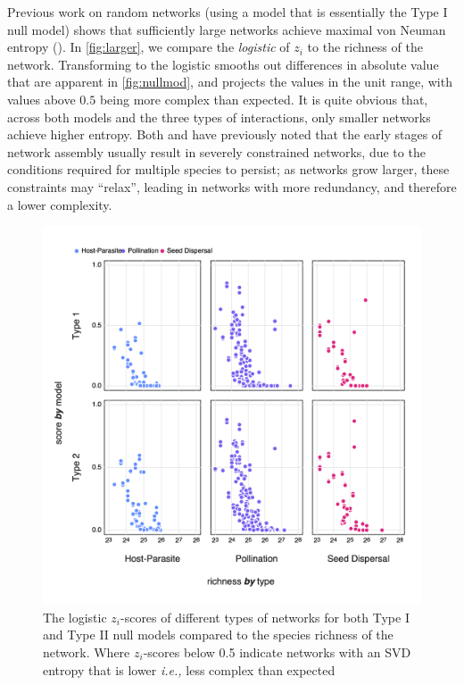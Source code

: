 \begin{refsection}
Previous work on random networks (using a model that is essentially the Type I
null model) shows that sufficiently large networks achieve maximal von Neuman
entropy (\cite{Du2010NotNeu, Passerini2011NeuEnt}). In \autoref{fig:larger}, we compare the
\emph{logistic} of \(z_i\) to the richness of the network. Transforming to the
logistic smooths out differences in absolute value that are apparent in
\autoref{fig:nullmod}, and projects the values in the unit range, with values
above \(0.5\) being more complex than expected. It is quite obvious that, across
both models and the three types of interactions, only smaller networks achieve
higher entropy. Both \cite{Barbier2018GenAss} and \cite{Saravia2018EcoNet} have previously noted that the early stages of
network assembly usually result in severely constrained networks, due to the
conditions required for multiple species to persist; as networks grow larger,
these constraints may ``relax'', leading in networks with more redundancy, and
therefore a lower complexity.

\begin{figure}[h]
    \centering
    \includegraphics[width=\textwidth]{figures/nullmodel_richness.png}
    \caption{The logistic \(z_i\)-scores of different types of networks for both
Type I and Type II null models compared to the species richness of the network.
Where \(z_i\)-scores below 0.5 indicate networks with an SVD entropy that is
lower \emph{i.e.,} less complex than expected}
    \label{fig:larger}
\end{figure}


\end{refsection}
